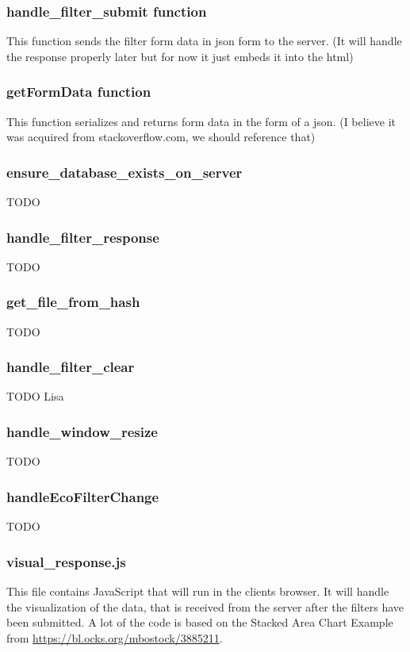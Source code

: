 \documentclass{article}
\begin{document}
\subsubsection*{handle\_filter\_submit function}
This function sends the filter form data in json form to the server. (It will handle the response properly later but for now it just embeds it into the html)


\subsubsection*{getFormData function}
This function serializes and returns form data in the form of a json. (I believe it was acquired from stackoverflow.com, we should reference that)


\subsubsection*{ensure\_database\_exists\_on\_server}
TODO


\subsubsection*{handle\_filter\_response}
TODO


\subsubsection*{get\_file\_from\_hash}
TODO


\subsubsection*{handle\_filter\_clear}
TODO Lisa


\subsubsection*{handle\_window\_resize}
TODO


\subsubsection*{handleEcoFilterChange}
TODO


\subsubsection{visual\_response.js}
This file contains JavaScript that will run in the clients browser. It will handle the visualization of the data, that is received from the server after
the filters have been submitted. A lot of the code is based on the Stacked Area
Chart Example from \url{https://bl.ocks.org/mbostock/3885211}.
\end{document}
